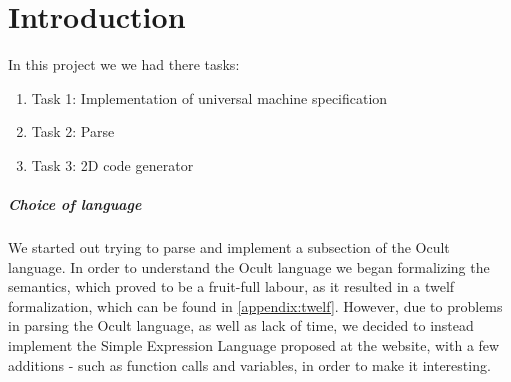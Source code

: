 \chapter*{Introduction}

In this project we we had there tasks:
\begin{enumerate}
\item Task 1: Implementation of universal machine specification
\item Task 2: Parse
\item Task 3: 2D code generator 
\end{enumerate}


\paragraph{Choice of language}
We started out trying to parse and implement a subsection of the Ocult language. In order to understand the Ocult language we began formalizing the semantics, which proved to be a fruit-full labour, as it resulted in a twelf formalization, which can be found in \ref{appendix:twelf}. However, due to problems in parsing the Ocult language, as well as lack of time, we decided to instead implement the Simple Expression Language proposed at the website, with a few additions - such as function calls and variables, in order to make it interesting.


